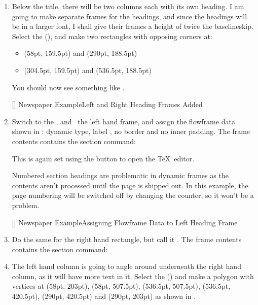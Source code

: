 \begin{enumerate}
\item Below the title, there will be two columns each with its
own heading. I am going to make separate frames for the headings,
and since the headings will be in a larger font, I shall give their
frames a height of twice the \gls{baselineskip}. Select the
 (), and make two
rectangles with opposing corners at:
\begin{itemize}
\item (58pt, 159.5pt) and (290pt, 188.5pt)
\item (304.5pt, 159.5pt) and (536.5pt, 188.5pt)
\end{itemize}
You should now see something like .

[]
{}
{Newspaper Example\dash Left and Right Heading Frames Added}

\item Switch to the , and
\select\ the left hand frame, and assign the \gls{flowframe} data shown in
: dynamic type, label , no
border and no inner padding. The frame contents contains the section
command:
\begin{compactcodebox}
\end{compactcodebox}
This is again set using the  button
to open the \TeX\ editor.

\begin{information}
Numbered section headings are problematic in dynamic frames as the
contents aren't processed until the page is shipped out. In this
example, the page numbering will be switched off by changing
the  counter, so it won't be a problem.
\end{information}

[]
{}
{Newspaper Example\dash Assigning Flowframe Data to Left
Heading Frame}

\item Do the same for the right hand rectangle, but
call it . The frame contents contains the
section command:
\begin{compactcodebox}
\end{compactcodebox}

\item The left hand column is going to angle around underneath the
right hand column, as it will have more text in it. Select the
 () and make a
polygon with vertices at (58pt, 203pt), (58pt, 507.5pt), (536.5pt,
507.5pt), (536.5pt, 420.5pt), (290pt, 420.5pt) and (290pt, 203pt) as
shown in .


\end{enumerate}
